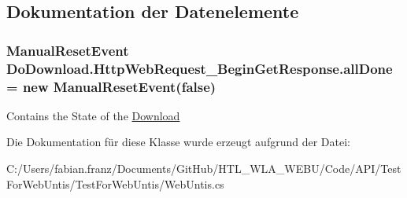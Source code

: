 \subsection{Dokumentation der Datenelemente}
\hypertarget{class_do_download_1_1_http_web_request___begin_get_response_a03670e4a51868848ede5ca7c7382066a}{
\subsubsection[{all\-Done}]{\setlength{\rightskip}{0pt plus 5cm}Manual\-Reset\-Event Do\-Download.\-Http\-Web\-Request\-\_\-\-Begin\-Get\-Response.\-all\-Done = new Manual\-Reset\-Event(false)\hspace{0.3cm}{\ttfamily [static]}}}\label{class_do_download_1_1_http_web_request___begin_get_response_a03670e4a51868848ede5ca7c7382066a}
Contains the State of the \hyperlink{namespace_download}{Download} 

Die Dokumentation für diese Klasse wurde erzeugt aufgrund der Datei\-:\begin{DoxyCompactItemize}
\item 
C\-:/\-Users/fabian.\-franz/\-Documents/\-Git\-Hub/\-H\-T\-L\-\_\-\-W\-L\-A\-\_\-\-W\-E\-B\-U/\-Code/\-A\-P\-I/\-Test\-For\-Web\-Untis/\-Test\-For\-Web\-Untis/Web\-Untis.\-cs\end{DoxyCompactItemize}
